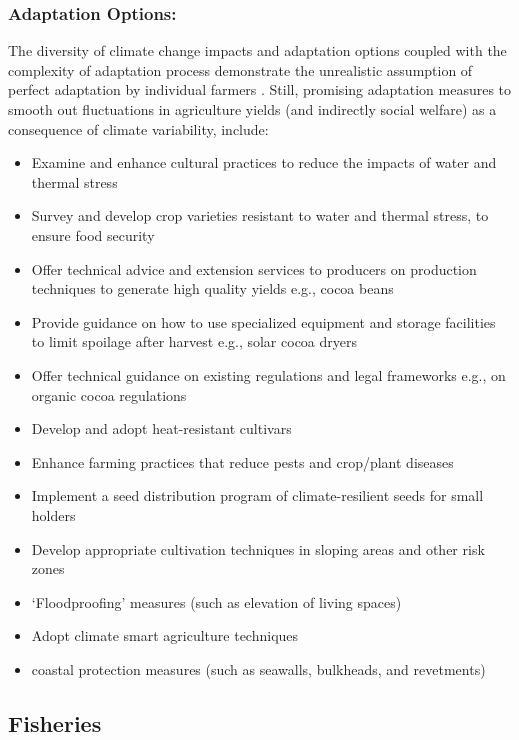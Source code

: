 \documentclass[
]{book}
\providecommand{\tightlist}{%
  \setlength{\itemsep}{0pt}\setlength{\parskip}{0pt}}
\begin{document}
\hypertarget{adaptation-options}{%
\subsubsection{Adaptation Options:}\label{adaptation-options}}

The diversity of climate change impacts and adaptation options coupled with the complexity of adaptation process demonstrate the unrealistic assumption of perfect adaptation by individual farmers . Still, promising adaptation measures to smooth out fluctuations in agriculture yields (and indirectly social welfare) as a consequence of climate variability, include:

\begin{itemize}
\tightlist
\item
  Examine and enhance cultural practices to reduce the impacts of water and thermal stress
\item
  Survey and develop crop varieties resistant to water and thermal stress, to ensure food security
\item
  Offer technical advice and extension services to producers on production techniques to generate high quality yields e.g., cocoa beans
\item
  Provide guidance on how to use specialized equipment and storage facilities to limit spoilage after harvest e.g., solar cocoa dryers
\item
  Offer technical guidance on existing regulations and legal frameworks e.g., on organic cocoa regulations
\item
  Develop and adopt heat-resistant cultivars
\item
  Enhance farming practices that reduce pests and crop/plant diseases
\item
  Implement a seed distribution program of climate-resilient seeds for small holders
\item
  Develop appropriate cultivation techniques in sloping areas and other risk zones
\item
  `Floodproofing' measures (such as elevation of living spaces)
\item
  Adopt climate smart agriculture techniques
\item
  coastal protection measures (such as seawalls, bulkheads, and revetments)
\end{itemize}

\hypertarget{fisheries}{%
\subsection{Fisheries}\label{fisheries}}
\end{document}
